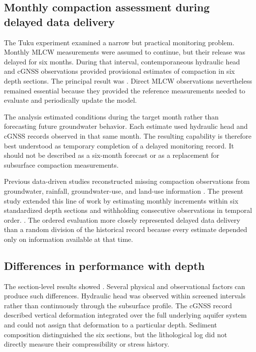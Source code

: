 \subsection{Monthly compaction assessment during delayed data delivery}
\label{subsec:discussion_delay}

The Tuku experiment examined a narrow but practical monitoring problem. Monthly MLCW measurements were assumed to continue, but their release was delayed for six months. During that interval, contemporaneous hydraulic head and cGNSS observations provided provisional estimates of compaction in six depth sections. The principal result was . Direct MLCW observations nevertheless remained essential because they provided the reference measurements needed to evaluate and periodically update the model.

The analysis estimated conditions during the target month rather than forecasting future groundwater behavior. Each estimate used hydraulic head and cGNSS records observed in that same month. The resulting capability is therefore best understood as temporary completion of a delayed monitoring record. It should not be described as a six-month forecast or as a replacement for subsurface compaction measurements.

Previous data-driven studies reconstructed missing compaction observations from groundwater, rainfall, groundwater-use, and land-use information \citep{liu_reconstructing_2023, liu_deep_2025}. The present study extended this line of work by estimating monthly increments within six standardized depth sections and withholding consecutive observations in temporal order. . The ordered evaluation more closely represented delayed data delivery than a random division of the historical record because every estimate depended only on information available at that time.

\subsection{Differences in performance with depth}
\label{subsec:discussion_depth}

The section-level results showed . Several physical and observational factors can produce such differences. Hydraulic head was observed within screened intervals rather than continuously through the subsurface profile. The cGNSS record described vertical deformation integrated over the full underlying aquifer system and could not assign that deformation to a particular depth. Sediment composition distinguished the six sections, but the lithological log did not directly measure their compressibility or stress history.

